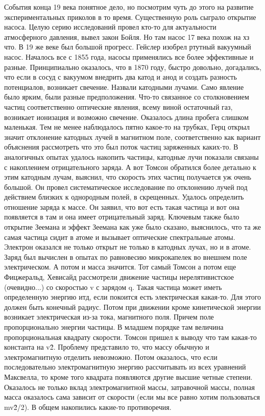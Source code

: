 \documentclass[a4paper, 12pt]{article}
\begin{document}
События конца 19 века понятное дело, но посмотрим чуть до этого на 
развитие экспериментальных приколов в то время. Существенную роль 
сыграло открытие насоса. Целую серию исследований провел кто-то для 
актуальности атмосферного давления, вывел закон Бойля. Но там насос 17 
века похож на хз что. В 19 же веке был большой прогресс. Гейслер изобрел 
ртутный вакуумный насос. Началось все с 1855 года, насосы применялись 
все более эффективные и разные. Принципиально оказалось, что в 1870 
году, быстро довольно, догадались, что если в сосуд с вакуумом внедрить 
два катод и анод и создать разность потенциалов, возникает свечение. 
Назвали катодными лучами. Само явление было ярким, были разные 
предположения. Что-то связанное со столкновением частиц соответственно 
оптические явления, всему виной остаточный газ, возникает ионизация 
и возможно свечение. Оказалось длина пробега слишком маленькая. Тем не 
менее наблюдалось пятно какое-то на трубках, Герц открыл значит 
отклонение катодных лучей в магнитном поле, соответственно как вариант 
объяснения рассмотреть что это был поток частиц заряженных каких-то. 
В аналогичных опытах удалось накопить частицы, катодные лучи показали 
связаны с накоплением отрицательного заряда. А вот Томсон обратился 
более детально к этим катодным лучам, выяснил, что скорость этих частиц 
получается уж очень большой. Он провел систематическое исследование по 
отклонению лучей под действием близких к однородным полей, в скрещенных. 
Удалось определить отношение заряда к массе. Он заявил, что вот есть 
такая частица и вот она появляется в там и она имеет отрицательный 
заряд. Ключевым также было открытие Зеемана и эффект Зеемана как уже 
было сказано, выяснилось, что та же самая частица сидит в атоме 
и вызывает оптические спектральные атомы. Электрон оказался не только 
открыт не только в катодных лучах, но и в атоме. Заряд был вычислен 
в опытах по равновесию микрокапелек во внешнем поле электрическом. 
А потом и масса значится. Тот самый Томсон а потом еще Фицжеральд, 
Хевисайд рассмотрели движение частицы нерелятивистское (очевидно...) со 
скоростью v с зарядом q. Такая частица может иметь определенную энергию 
итд, если покоится есть электрическая какая-то. Для этого должен быть 
конечный радиус. Потом при движении кроме кинетической энергии возникает 
электрическая из-за тока, магнитного поля. Причем поле пропорционально 
энергии частицы. В младшем порядке там величина пропорциональная 
квадрату скорости. Томсон пришел к выводу что там какая-то константа на 
v\^2. Проблему представило то, что массу обычную и электромагнитную 
отделить невозможно. Потом оказалось, что если последовательно 
электромагнитную энергию рассчитывать из всех уравнений Максвелла, то 
кроме того квадрата появляются другие высшие четные степени. Оказалось 
не только вклад электромагнитной массы, затравочной массы, полная масса 
оказалось сама зависит от скорости (если мы все равно хотим пользоваться 
mv\^2/2). В общем накопились какие-то противоречия.
\end{document}

